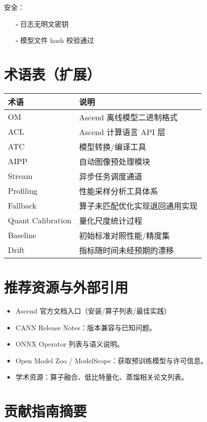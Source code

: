 安全：

\begin{itemize}
\tightlist
\item[$\square$]
  日志无明文密钥
\item[$\square$]
  模型文件 hash 校验通过
\end{itemize}

\section{术语表（扩展）}\label{ux672fux8bedux8868ux6269ux5c55}

\begin{longtable}[]{@{}ll@{}}
\toprule\noalign{}
术语 & 说明 \\
\midrule\noalign{}
\endhead
\bottomrule\noalign{}
\endlastfoot
OM & Ascend 离线模型二进制格式 \\
ACL & Ascend 计算语言 API 层 \\
ATC & 模型转换/编译工具 \\
AIPP & 自动图像预处理模块 \\
Stream & 异步任务调度通道 \\
Profiling & 性能采样分析工具体系 \\
Fallback & 算子未匹配优化实现退回通用实现 \\
Quant Calibration & 量化尺度统计过程 \\
Baseline & 初始标准对照性能/精度集 \\
Drift & 指标随时间未经预期的漂移 \\
\end{longtable}

\section{推荐资源与外部引用}\label{ux63a8ux8350ux8d44ux6e90ux4e0eux5916ux90e8ux5f15ux7528}

\begin{itemize}
\tightlist
\item
  Ascend 官方文档入口（安装/算子列表/最佳实践）
\item
  CANN Release Notes：版本兼容与已知问题。
\item
  ONNX Operator 列表与语义说明。
\item
  Open Model Zoo / ModelScope：获取预训练模型与许可信息。
\item
  学术资源：算子融合、低比特量化、蒸馏相关论文列表。
\end{itemize}

\section{贡献指南摘要}\label{ux8d21ux732eux6307ux5357ux6458ux8981}

